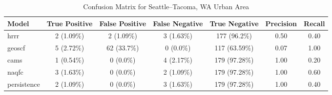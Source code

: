 \begin{table}[h!]
\centering
\begin{tabular}{lcccccc}
\hline
Model & True Positive & False Positive & False Negative & True Negative & Precision & Recall\\ \hline
hrrr & 2 (1.09\%) & 2 (1.09\%) & 3 (1.63\%) & 177 (96.2\%) & \cellcolor{red!25}0.50 & \cellcolor{green!25}0.40 \\ 
geoscf & 5 (2.72\%) & 62 (33.7\%) & 0 (0.0\%) & 117 (63.59\%) & \cellcolor{red!25}0.07 & \cellcolor{green!25}1.00 \\ 
cams & 1 (0.54\%) & 0 (0.0\%) & 4 (2.17\%) & 179 (97.28\%) & \cellcolor{green!25}1.00 & \cellcolor{red!25}0.20 \\ 
naqfc & 3 (1.63\%) & 0 (0.0\%) & 2 (1.09\%) & 179 (97.28\%) & \cellcolor{green!25}1.00 & \cellcolor{green!25}0.60 \\ 
persistence & 2 (1.09\%) & 0 (0.0\%) & 3 (1.63\%) & 179 (97.28\%) & 1.00 & 0.40 \\ 
\hline
\end{tabular}
\caption{Confusion Matrix for Seattle--Tacoma, WA Urban Area}
\end{table}
